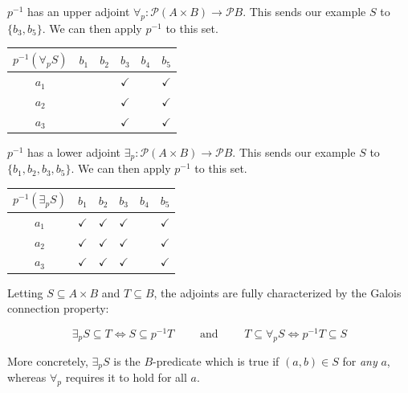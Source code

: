 \documentclass{article}
\newif\ifproofsinappendix
\theoremstyle{definition}
\newcommand{\cP}{\mathcal{P}}
\begin{document}
$p^{-1}$ has an upper adjoint $\forall_p\colon \cP(A\times B)\to \cP B$. This sends our example $S$ to $\{b_3,b_5\}$. We can then apply $p^{-1}$ to this set.


\begin{table}[h!]
\centering
\begin{tabular}{|c|c|c|c|c|c|}
\hline
$p^{-1}(\forall_p S)$   & $b_1$        & $b_2$        & $b_3$        & $b_4$ & $b_5$        \\ \hline
$a_1$ &  &              & $\checkmark$ &       & $\checkmark$ \\ \hline
$a_2$ &              &  & $\checkmark$ &       & $\checkmark$ \\ \hline
$a_3$ &              &              & $\checkmark$ &       & $\checkmark$ \\ \hline
\end{tabular}
\end{table}


$p^{-1}$ has a lower adjoint $\exists_p\colon \cP(A\times B)\to \cP B$. This sends our example $S$ to $\{b_1,b_2,b_3,b_5\}$. We can then apply $p^{-1}$ to this set.

\begin{table}[h!]
\centering
\begin{tabular}{|c|c|c|c|c|c|}
\hline
$p^{-1}(\exists_p S)$   & $b_1$        & $b_2$        & $b_3$        & $b_4$ & $b_5$        \\ \hline
$a_1$ & $\checkmark$ &     $\checkmark$         & $\checkmark$ &       & $\checkmark$ \\ \hline
$a_2$ &    $\checkmark$          & $\checkmark$ & $\checkmark$ &       & $\checkmark$ \\ \hline
$a_3$ &    $\checkmark$          &     $\checkmark$         & $\checkmark$ &       & $\checkmark$ \\ \hline
\end{tabular}
\end{table}


Letting $S\subseteq A\times B$ and $T\subseteq B$, the adjoints are fully characterized by the Galois connection property: 

$$\exists_p S \subseteq T \iff S \subseteq p^{-1}T \qquad  \text{ and }\qquad T \subseteq \forall_p S \iff p^{-1}T \subseteq S$$ 

More concretely, $\exists_p S$ is the $B$-predicate which is true if $(a,b) \in S$ for {\it any} $a$, whereas $\forall_p$ requires it to hold for all $a$. 


\ifproofsinappendix
\end{document}
